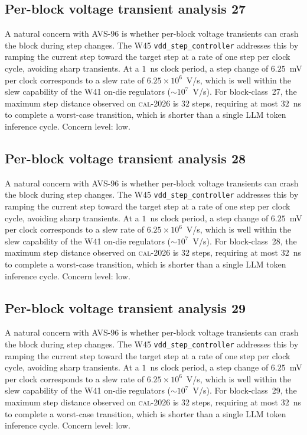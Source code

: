 \subsection{Per-block voltage transient analysis 27}

A natural concern with AVS-96 is whether per-block voltage transients
can crash the block during step changes. The W45 \texttt{vdd\_step\_controller} addresses this by ramping the current
step toward the target step at a rate of one step per clock cycle,
avoiding sharp transients. At a $1$~ns clock period, a step change of
$6.25$~mV per clock corresponds to a slew rate of $6.25\times 10^6$~V/s,
which is well within the slew capability of the W41 on-die regulators
($\sim 10^7$~V/s). For block-class~27, the maximum step distance
observed on \textsc{cal-2026} is $32$ steps, requiring at most $32$~ns
to complete a worst-case transition, which is shorter than a single
LLM token inference cycle. Concern level: low.


\subsection{Per-block voltage transient analysis 28}

A natural concern with AVS-96 is whether per-block voltage transients
can crash the block during step changes. The W45 \texttt{vdd\_step\_controller} addresses this by ramping the current
step toward the target step at a rate of one step per clock cycle,
avoiding sharp transients. At a $1$~ns clock period, a step change of
$6.25$~mV per clock corresponds to a slew rate of $6.25\times 10^6$~V/s,
which is well within the slew capability of the W41 on-die regulators
($\sim 10^7$~V/s). For block-class~28, the maximum step distance
observed on \textsc{cal-2026} is $32$ steps, requiring at most $32$~ns
to complete a worst-case transition, which is shorter than a single
LLM token inference cycle. Concern level: low.


\subsection{Per-block voltage transient analysis 29}

A natural concern with AVS-96 is whether per-block voltage transients
can crash the block during step changes. The W45 \texttt{vdd\_step\_controller} addresses this by ramping the current
step toward the target step at a rate of one step per clock cycle,
avoiding sharp transients. At a $1$~ns clock period, a step change of
$6.25$~mV per clock corresponds to a slew rate of $6.25\times 10^6$~V/s,
which is well within the slew capability of the W41 on-die regulators
($\sim 10^7$~V/s). For block-class~29, the maximum step distance
observed on \textsc{cal-2026} is $32$ steps, requiring at most $32$~ns
to complete a worst-case transition, which is shorter than a single
LLM token inference cycle. Concern level: low.


